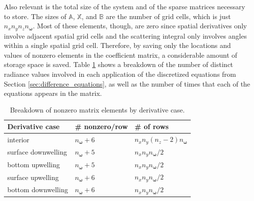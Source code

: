\documentclass[ms,cpyr,lof,lot]{uathesis}
\renewcommand\vec\bm
\newcommand\nomega{{n_{\vec{\omega}}}}
\begin{document}
Also relevant is the total size of the system and of the sparse matrices necessary to store.
The sizes of $\mathbb{A}$, $\mathbb{X}$, and $\mathbb{B}$ are the number of grid cells, which is just $n_xn_yn_z\nomega$.
Most of these elements, though, are zero since spatial derivatives only involve adjacent spatial grid cells and the scattering integral only involves angles within a single spatial grid cell.
Therefore, by saving only the locations and values of nonzero elements in the coefficient matrix, a considerable amount of storage space is saved.
Table \ref{tab:nonzero} shows a breakdown of the number of distinct radiance values involved in each application of the discretized equations from Section \ref{sec:difference_equations}, as well as the number of times that each of the equations appears in the matrix.

\begin{table}[H]
  \centering
  \caption{Breakdown of nonzero matrix elements by derivative case.}
  \begin{tabular}{p{}p{}p{}}
    \toprule
    \textbf{Derivative case} & \textbf{\# nonzero/row} & \textbf{\# of rows} \\
    \midrule
    interior & $\nomega+6$ & $n_xn_y(n_z-2)\nomega$ \\
    surface downwelling & $\nomega+5$ & $n_xn_y\nomega/2$ \\
    bottom upwelling & $\nomega+5$ & $n_xn_y\nomega/2$ \\
    surface upwelling & $\nomega+6$ & $n_xn_y\nomega/2$ \\
    bottom downwelling & $\nomega+6$ & $n_xn_y\nomega/2$ \\
    \bottomrule
  \end{tabular}
  \label{tab:nonzero}
\end{table}
\end{document}

